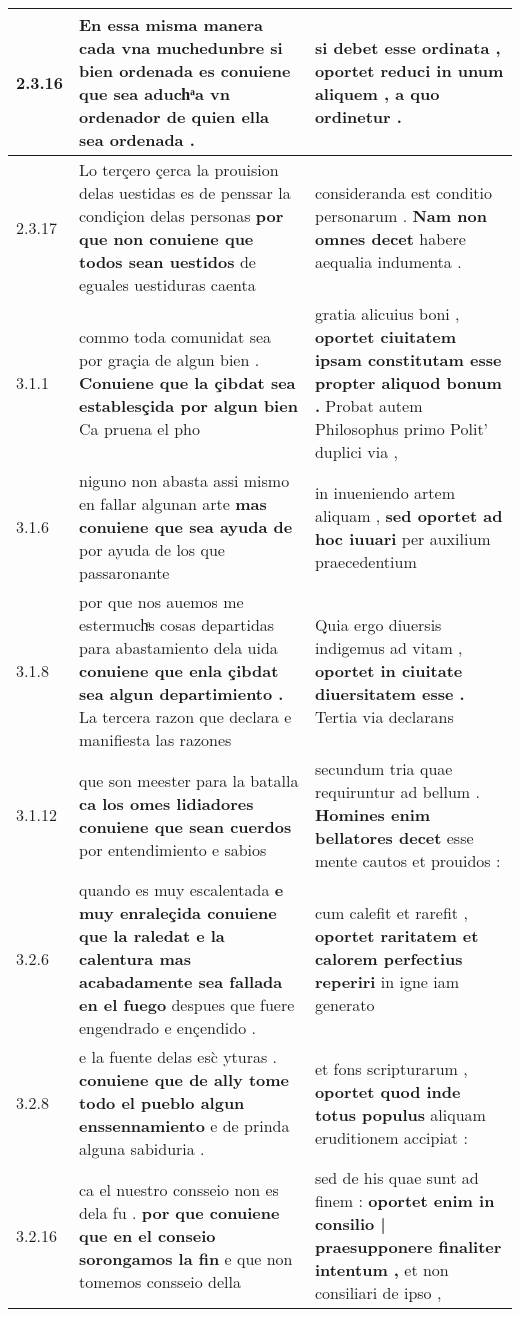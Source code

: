 \begin{tabular}{|p{1cm}|p{6.5cm}|p{6.5cm}|}
2.3.16 & En essa misma manera cada vna muchedunbre si bien ordenada es \textbf{ conuiene que sea aduchͣa vn ordenador } de quien ella sea ordenada . & si debet esse ordinata , \textbf{ oportet reduci in unum aliquem , } a quo ordinetur . \\\hline
2.3.17 & Lo terçero çerca la prouision delas uestidas es de penssar la condiçion delas personas \textbf{ por que non conuiene que todos sean uestidos } de eguales uestiduras caenta & consideranda est conditio personarum . \textbf{ Nam non omnes decet } habere aequalia indumenta . \\\hline
3.1.1 & commo toda comunidat sea por graçia de algun bien . \textbf{ Conuiene que la çibdat sea establesçida por algun bien } Ca pruena el pho & gratia alicuius boni , \textbf{ oportet ciuitatem ipsam constitutam esse propter aliquod bonum . } Probat autem Philosophus primo Polit’ duplici via , \\\hline
3.1.6 & niguno non abasta assi mismo en fallar algunan arte \textbf{ mas conuiene que sea ayuda de } por ayuda de los que passaronante & in inueniendo artem aliquam , \textbf{ sed oportet ad hoc iuuari } per auxilium praecedentium \\\hline
3.1.8 & por que nos auemos me estermuchͣs cosas departidas para abastamiento dela uida \textbf{ conuiene que enla çibdat sea algun departimiento . } La tercera razon que declara e manifiesta las razones & Quia ergo diuersis indigemus ad vitam , \textbf{ oportet in ciuitate diuersitatem esse . } Tertia via declarans \\\hline
3.1.12 & que son meester para la batalla \textbf{ ca los omes lidiadores conuiene que sean cuerdos } por entendimiento e sabios & secundum tria quae requiruntur ad bellum . \textbf{ Homines enim bellatores decet } esse mente cautos et prouidos : \\\hline
3.2.6 & quando es muy escalentada \textbf{ e muy enraleçida conuiene que la raledat e la calentura mas acabadamente sea fallada en el fuego } despues que fuere engendrado e ençendido . & cum calefit et rarefit , \textbf{ oportet raritatem et calorem perfectius reperiri } in igne iam generato \\\hline
3.2.8 & e la fuente delas esc̀ yturas . \textbf{ conuiene que de ally tome todo el pueblo algun enssennamiento } e de prinda alguna sabiduria . & et fons scripturarum , \textbf{ oportet quod inde totus populus } aliquam eruditionem accipiat : \\\hline
3.2.16 & ca el nuestro consseio non es dela fu . \textbf{ por que conuiene que en el conseio sorongamos la fin } e que non tomemos consseio della & sed de his quae sunt ad finem : \textbf{ oportet enim in consilio | praesupponere finaliter intentum , } et non consiliari de ipso , \\\hline

\end{tabular}
